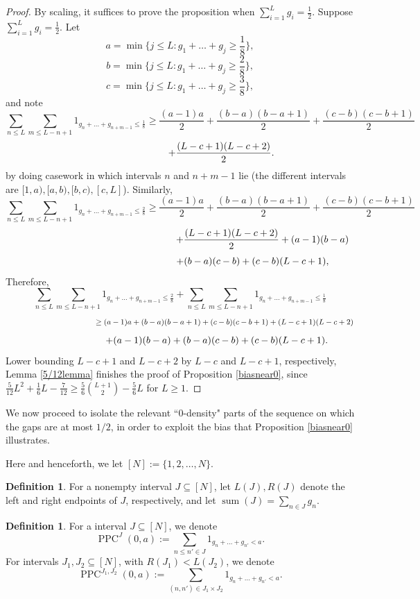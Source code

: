 \documentclass[12pt]{amsart}
\theoremstyle{definition}
\newtheorem{definition}[proposition]{Definition}
\newcommand{\vs}{\vspace{3mm}}
\newcommand{\sub}{\subseteq}
\DeclareMathOperator{\PPC}{PPC}
\DeclareMathOperator{\summ}{sum}
\begin{document}
\begin{proof}
By scaling, it suffices to prove the proposition when $\sum_{i=1}^L g_i = \frac{1}{2}$. Suppose $\sum_{i=1}^L g_i = \frac{1}{2}$. Let $$a = \min\{j \le L : g_1+\dots+g_j \ge \frac{1}{8}\},$$ $$b = \min\{j \le L : g_1+\dots+g_j \ge \frac{2}{8}\},$$ $$c = \min\{j \le L : g_1+\dots+g_j \ge \frac{3}{8}\},$$ and note $$\sum_{n \le L}\sum_{m \le L-n+1} 1_{g_n+\dots+g_{n+m-1} \le \frac{1}{8}} \ge \frac{(a-1)a}{2}+\frac{(b-a)(b-a+1)}{2}+\frac{(c-b)(c-b+1)}{2}$$ $$\hspace{30mm} +\frac{(L-c+1)(L-c+2)}{2}.$$ by doing casework in which intervals $n$ and $n+m-1$ lie (the different intervals are $[1,a),[a,b),[b,c),[c,L]$). Similarly, $$\sum_{n \le L} \sum_{m \le L-n+1} 1_{g_n+\dots+g_{n+m-1} \le \frac{2}{8}} \ge \frac{(a-1)a}{2}+\frac{(b-a)(b-a+1)}{2}+\frac{(c-b)(c-b+1)}{2}$$ $$\hspace{60mm} +\frac{(L-c+1)(L-c+2)}{2}+(a-1)(b-a)$$ $$\hspace{52.7mm} +(b-a)(c-b)+(c-b)(L-c+1),$$ Therefore, $$\sum_{n \le L} \sum_{m \le L-n+1} 1_{g_n+\dots+g_{n+m-1} \le \frac{2}{8}} +  \sum_{n \le L}\sum_{m \le L-n+1} 1_{g_n+\dots+g_{n+m-1} \le \frac{1}{8}}$$ $$\hspace{40mm} \ge (a-1)a+(b-a)(b-a+1)+(c-b)(c-b+1)+(L-c+1)(L-c+2)$$ $$\hspace{26.5mm} +(a-1)(b-a)+(b-a)(c-b)+(c-b)(L-c+1).$$ Lower bounding $L-c+1$ and $L-c+2$ by $L-c$ and $L-c+1$, respectively, Lemma \ref{5/12lemma} finishes the proof of Proposition \ref{biasnear0}, since $\frac{5}{12}L^2+\frac{1}{6}L-\frac{7}{12} \ge \frac{5}{6}{L + 1 \choose 2}-\frac{5}{6}L$ for $L \ge 1$. 
\end{proof}




\vs

We now proceed to isolate the relevant ``$0$-density" parts of the sequence on which the gaps are at most $1/2$, in order to exploit the bias that Proposition \ref{biasnear0} illustrates. 

\vspace{4.5mm}

Here and henceforth, we let $[N]:=\{1,2,\ldots,N\}$.

\begin{definition}
For a nonempty interval $J \sub [N]$, let $L(J),R(J)$ denote the left and right endpoints of $J$, respectively, and let $\summ(J) = \sum_{n \in J} g_n$. 
\end{definition}


\begin{definition}
For a interval $J \sub [N]$, we denote \vspace{0.5mm} $$\PPC^J(0,a) := \sum_{n \le n' \in J} 1_{g_n+\dots+g_{n'} < a}.$$ For intervals $J_1, J_2 \sub [N]$, with $R(J_1) < L(J_2)$, we denote \vspace{1mm} $$\PPC^{J_1,J_2}(0,a) := \sum_{(n,n') \in J_1\times J_2} 1_{g_n+\dots+g_{n'} < a}.$$ 
\end{definition}
\end{document}
